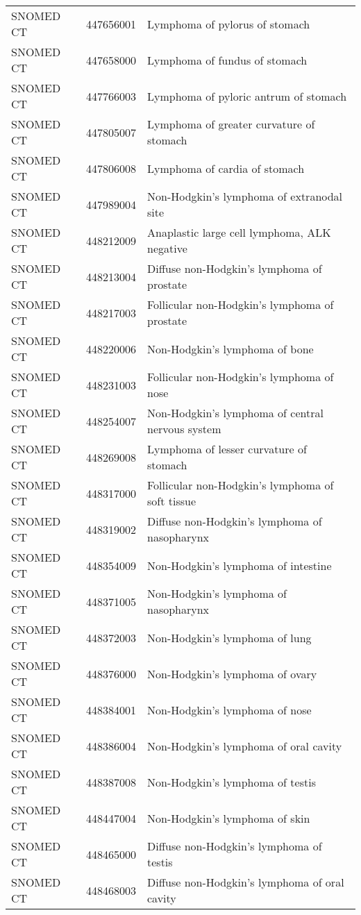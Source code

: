 \begin{longtable}{p{}p{}p{}}
  SNOMED CT & 447656001 & Lymphoma of pylorus of stomach \\ 
  SNOMED CT & 447658000 & Lymphoma of fundus of stomach \\ 
  SNOMED CT & 447766003 & Lymphoma of pyloric antrum of stomach \\ 
  SNOMED CT & 447805007 & Lymphoma of greater curvature of stomach \\ 
  SNOMED CT & 447806008 & Lymphoma of cardia of stomach \\ 
  SNOMED CT & 447989004 & Non-Hodgkin's lymphoma of extranodal site \\ 
  SNOMED CT & 448212009 & Anaplastic large cell lymphoma, ALK negative \\ 
  SNOMED CT & 448213004 & Diffuse non-Hodgkin's lymphoma of prostate \\ 
  SNOMED CT & 448217003 & Follicular non-Hodgkin's lymphoma of prostate \\ 
  SNOMED CT & 448220006 & Non-Hodgkin's lymphoma of bone \\ 
  SNOMED CT & 448231003 & Follicular non-Hodgkin's lymphoma of nose \\ 
  SNOMED CT & 448254007 & Non-Hodgkin's lymphoma of central nervous system \\ 
  SNOMED CT & 448269008 & Lymphoma of lesser curvature of stomach \\ 
  SNOMED CT & 448317000 & Follicular non-Hodgkin's lymphoma of soft tissue \\ 
  SNOMED CT & 448319002 & Diffuse non-Hodgkin's lymphoma of nasopharynx \\ 
  SNOMED CT & 448354009 & Non-Hodgkin's lymphoma of intestine \\ 
  SNOMED CT & 448371005 & Non-Hodgkin's lymphoma of nasopharynx \\ 
  SNOMED CT & 448372003 & Non-Hodgkin's lymphoma of lung \\ 
  SNOMED CT & 448376000 & Non-Hodgkin's lymphoma of ovary \\ 
  SNOMED CT & 448384001 & Non-Hodgkin's lymphoma of nose \\ 
  SNOMED CT & 448386004 & Non-Hodgkin's lymphoma of oral cavity \\ 
  SNOMED CT & 448387008 & Non-Hodgkin's lymphoma of testis \\ 
  SNOMED CT & 448447004 & Non-Hodgkin's lymphoma of skin \\ 
  SNOMED CT & 448465000 & Diffuse non-Hodgkin's lymphoma of testis \\ 
  SNOMED CT & 448468003 & Diffuse non-Hodgkin's lymphoma of oral cavity \\ 

\end{longtable}
